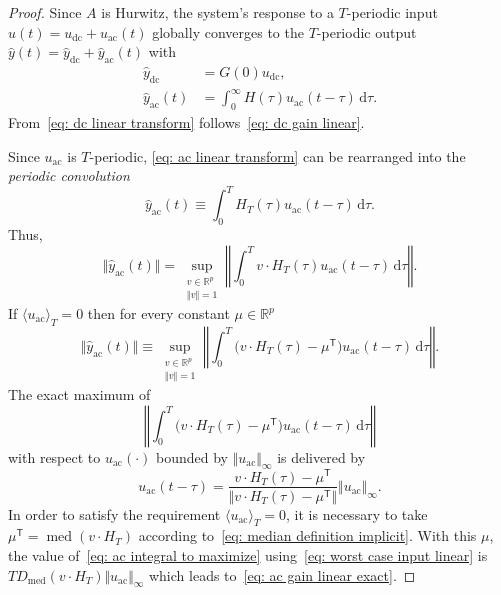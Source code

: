 \documentclass[10pt,a4paper]{amsart}
\newcommand{\ac}{_\mathrm{ac}}
\newcommand{\bbR}{\mathbb{R}}
\newcommand{\dc}{_\mathrm{dc}}
\newcommand{\dif}{\mathrm{d}}
\newcommand{\mean}[1]{\langle #1 \rangle}
\DeclareMathOperator{\median}{med}
\newcommand{\norm}[1]{\Vert #1 \Vert}
\newcommand{\normx}[1]{\left\Vert #1 \right\Vert}
\newcommand{\pb}[1]{\big( #1 \big)}
\newcommand{\trans}{^\mathsf{T}}
\begin{document}
\begin{proof}
    Since $A$ is Hurwitz, the system's response to a $T$-periodic input $u(t) = u\dc + u\ac(t)$ globally converges to the $T$-periodic output $\hat y(t) = \hat y\dc + \hat y\ac(t)$ with
    \begin{subequations}
        \begin{align}
            \label{eq: dc linear transform}
            \hat y\dc &= G(0) u\dc,\\
            \label{eq: ac linear transform}
            \hat y\ac(t) &= \int_0^\infty H(\tau) u\ac(t-\tau) \,\dif\tau.
        \end{align}
    \end{subequations}
    From~\eqref{eq: dc linear transform} follows~\eqref{eq: dc gain linear}.
    
    Since $u\ac$ is $T$-periodic, \eqref{eq: ac linear transform} can be rearranged into the \emph{periodic convolution}
    \begin{equation}
        \label{eq: ac linear transform periodic}
        \hat y\ac(t) \equiv \int_0^T H_T(\tau) u\ac(t-\tau) \,\dif\tau.
    \end{equation}
    Thus,
    \begin{equation}
        \label{eq: output norm as supremum}
        \norm{\hat y\ac(t)} = \sup_{\substack{v\in\bbR^p \\ \norm{v} = 1}}
        \normx{\int_0^T v \cdot H_T(\tau) u\ac(t-\tau) \,\dif\tau}.
    \end{equation}
    If $\mean{u\ac}_T = 0$ then for every constant $\mu \in \bbR^p$
    \begin{equation}
        \norm{\hat y\ac(t)} \equiv \sup_{\substack{v\in\bbR^p \\ \norm{v} = 1}}
        \normx{\int_0^T \pb{v \cdot H_T(\tau) - \mu\trans} u\ac(t-\tau) \,\dif\tau}.
    \end{equation}
    The exact maximum of
    \begin{equation}
        \label{eq: ac integral to maximize}
        \normx{\int_0^T \pb{v \cdot H_T(\tau) - \mu\trans} u\ac(t-\tau) \,\dif\tau}
    \end{equation}
    with respect to $u\ac(\cdot)$ bounded by $\norm{u\ac}_\infty$ is delivered by
    \begin{equation}
        \label{eq: worst case input linear}
        u\ac(t-\tau) = \frac{v \cdot H_T(\tau) - \mu\trans}
        {\norm{v \cdot H_T(\tau) - \mu\trans}} \norm{u\ac}_\infty.
    \end{equation}
    In order to satisfy the requirement $\mean{u\ac}_T = 0$, it is necessary to take $\mu\trans = \median(v \cdot H_T)$ according to~\eqref{eq: median definition implicit}. With this $\mu$, the value of~\eqref{eq: ac integral to maximize} using~\eqref{eq: worst case input linear} is $T D_{\median}(v \cdot H_T) \norm{u\ac}_\infty$ which leads to~\eqref{eq: ac gain linear exact}.
\end{proof}
\end{document}
